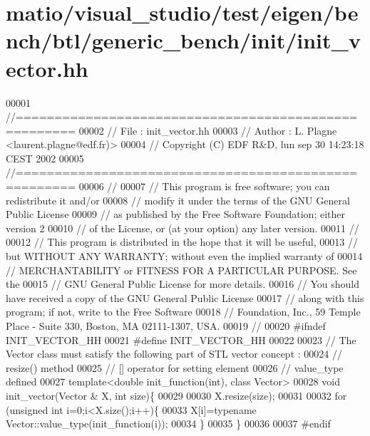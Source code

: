 \hypertarget{matio_2visual__studio_2test_2eigen_2bench_2btl_2generic__bench_2init_2init__vector_8hh_source}{}\section{matio/visual\+\_\+studio/test/eigen/bench/btl/generic\+\_\+bench/init/init\+\_\+vector.hh}
\label{matio_2visual__studio_2test_2eigen_2bench_2btl_2generic__bench_2init_2init__vector_8hh_source}

\begin{DoxyCode}
00001 \textcolor{comment}{//=====================================================}
00002 \textcolor{comment}{// File   :  init\_vector.hh}
00003 \textcolor{comment}{// Author :  L. Plagne <laurent.plagne@edf.fr)>}
00004 \textcolor{comment}{// Copyright (C) EDF R&D,  lun sep 30 14:23:18 CEST 2002}
00005 \textcolor{comment}{//=====================================================}
00006 \textcolor{comment}{//}
00007 \textcolor{comment}{// This program is free software; you can redistribute it and/or}
00008 \textcolor{comment}{// modify it under the terms of the GNU General Public License}
00009 \textcolor{comment}{// as published by the Free Software Foundation; either version 2}
00010 \textcolor{comment}{// of the License, or (at your option) any later version.}
00011 \textcolor{comment}{//}
00012 \textcolor{comment}{// This program is distributed in the hope that it will be useful,}
00013 \textcolor{comment}{// but WITHOUT ANY WARRANTY; without even the implied warranty of}
00014 \textcolor{comment}{// MERCHANTABILITY or FITNESS FOR A PARTICULAR PURPOSE.  See the}
00015 \textcolor{comment}{// GNU General Public License for more details.}
00016 \textcolor{comment}{// You should have received a copy of the GNU General Public License}
00017 \textcolor{comment}{// along with this program; if not, write to the Free Software}
00018 \textcolor{comment}{// Foundation, Inc., 59 Temple Place - Suite 330, Boston, MA  02111-1307, USA.}
00019 \textcolor{comment}{//}
00020 \textcolor{preprocessor}{#ifndef INIT\_VECTOR\_HH}
00021 \textcolor{preprocessor}{#define INIT\_VECTOR\_HH}
00022 
00023 \textcolor{comment}{// The Vector class must satisfy the following part of STL vector concept :}
00024 \textcolor{comment}{//            resize() method}
00025 \textcolor{comment}{//            [] operator for setting element}
00026 \textcolor{comment}{//            value\_type defined}
00027 \textcolor{keyword}{template}<\textcolor{keywordtype}{double} init\_function(\textcolor{keywordtype}{int}), \textcolor{keyword}{class} Vector>
00028 \textcolor{keywordtype}{void} init\_vector(Vector & X, \textcolor{keywordtype}{int} size)\{
00029 
00030   X.resize(size);
00031 
00032   \textcolor{keywordflow}{for} (\textcolor{keywordtype}{unsigned} \textcolor{keywordtype}{int} i=0;i<X.size();i++)\{
00033     X[i]=\textcolor{keyword}{typename} Vector::value\_type(init\_function(i));
00034   \}
00035 \}
00036 
00037 \textcolor{preprocessor}{#endif}
\end{DoxyCode}
